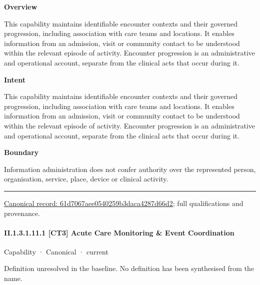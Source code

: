 \textbf{Overview}



This capability maintains identifiable encounter contexts and their governed progression, including association with care teams and locations. It enables information from an admission, visit or community contact to be understood within the relevant episode of activity. Encounter progression is an administrative and operational account, separate from the clinical acts that occur during it.



\textbf{Intent}



This capability maintains identifiable encounter contexts and their governed progression, including association with care teams and locations. It enables information from an admission, visit or community contact to be understood within the relevant episode of activity. Encounter progression is an administrative and operational account, separate from the clinical acts that occur during it.



\textbf{Boundary}



Information administration does not confer authority over the represented person, organisation, service, place, device or clinical activity.



\medskip\hrule\medskip

{\footnotesize \href{../../../../../../../continuum/strategy/capability/61d7067aee0540259b3daca4287d66d2.md}{Canonical record: 61d7067aee0540259b3daca4287d66d2}; full qualifications and provenance.}\par
\paragraph*{II.1.3.1.11.1 [CT3] Acute Care Monitoring \& Event Coordination}
\label{navigation:II.1.3.1.11.1}

\label{element:ee17b26b8c874cc3af50d07a787ce488}
{\small Capability · Canonical · current}\par

Definition unresolved in the baseline. No definition has been synthesised from the name.



